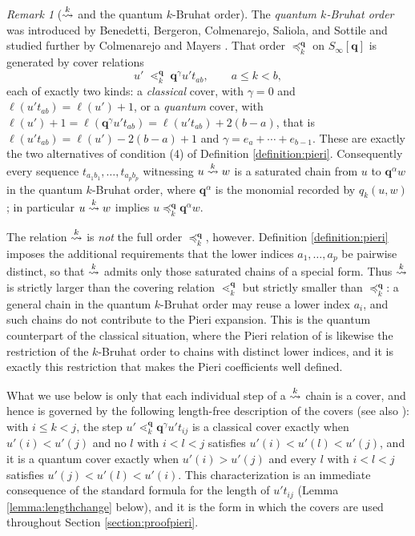 \documentclass{amsart}
\theoremstyle{definition}
\theoremstyle{remark}
\newtheorem{remark}[lemma]{Remark}
\numberwithin{equation}{section}
\newcommand{\xrightsquigarrow}[2][]{%
	\mathrel{\mathop{\rightsquigarrow}\limits^{\scriptstyle #2}%
	\ifx\hfuzz#1\hfuzz\else_{\scriptstyle #1}\fi}%
}
\newcommand{\tom}[1]{\ensuremath{\xrightsquigarrow{#1}}}
\begin{document}
\begin{remark}[$\tom{k}$ and the quantum $k$-Bruhat order] \label{remark:qkbruhat}
The \emph{quantum $k$-Bruhat order} was introduced by Benedetti, Bergeron, Colmenarejo, Saliola, and Sottile \cite{benedetti2025quantum} and studied further by Colmenarejo and Mayers \cite{colmenarejo2026quantum}. That order $\preceq_k^{\mathbf q}$ on $S_\infty[\mathbf q]$ is generated by cover relations
$$u'\;\lessdot_k^{\mathbf q}\;\mathbf q^{\gamma}u't_{ab},\qquad a\leq k<b,$$
each of exactly two kinds: a \emph{classical} cover, with $\gamma=0$ and $\ell(u't_{ab})=\ell(u')+1$, or a \emph{quantum} cover, with $\ell(u')+1=\ell(\mathbf q^{\gamma}u't_{ab})=\ell(u't_{ab})+2(b-a)$, that is $\ell(u't_{ab})=\ell(u')-2(b-a)+1$ and $\gamma=e_a+\cdots+e_{b-1}$. 
These are exactly the two alternatives of condition (4) of Definition \ref{definition:pieri}. Consequently every sequence $t_{a_1b_1},\ldots,t_{a_pb_p}$ witnessing $u\tom{k}w$ is a saturated chain from $u$ to $\mathbf q^{\alpha}w$ in the quantum $k$-Bruhat order, where $\mathbf q^{\alpha}$ is the monomial recorded by $q_k(u,w)$; in particular $u\tom{k}w$ implies $u\preceq_k^{\mathbf q}\mathbf q^{\alpha}w$.

The relation $\tom{k}$ is \emph{not} the full order $\preceq_k^{\mathbf q}$, however. Definition \ref{definition:pieri} imposes the additional requirements that the lower indices $a_1,\ldots,a_p$ be pairwise distinct, so that $\tom{k}$ admits only those saturated chains of a special form. Thus $\tom{k}$ is strictly larger than the covering relation $\lessdot_k^{\mathbf q}$ but strictly smaller than $\preceq_k^{\mathbf q}$: a general chain in the quantum $k$-Bruhat order may reuse a lower index $a_i$, and such chains do not contribute to the Pieri expansion. This is the quantum counterpart of the classical situation, where the Pieri relation of \cite{sottile,samuelmolev} is likewise the restriction of the $k$-Bruhat order to chains with distinct lower indices, and it is exactly this restriction that makes the Pieri coefficients well defined.

What we use below is only that each individual step of a $\tom{k}$ chain is a cover, and hence is governed by the following length-free description of the covers \cite[Proposition~3.1]{benedetti2025quantum} (see also \cite[Proposition~4.2]{colmenarejo2026quantum}): with $i\leq k<j$, the step $u'\lessdot_k^{\mathbf q}\mathbf q^{\gamma}u't_{ij}$ is a classical cover exactly when $u'(i)<u'(j)$ and no $l$ with $i<l<j$ satisfies $u'(i)<u'(l)<u'(j)$, and it is a quantum cover exactly when $u'(i)>u'(j)$ and every $l$ with $i<l<j$ satisfies $u'(j)<u'(l)<u'(i)$. This characterization is an immediate consequence of the standard formula for the length of $u't_{ij}$ (Lemma \ref{lemma:lengthchange} below), and it is the form in which the covers are used throughout Section \ref{section:proofpieri}.
\end{remark}
\end{document}
